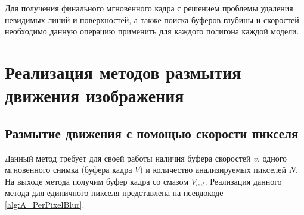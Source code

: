 Для получения финального мгновенного кадра с решением проблемы удаления невидимых линий и поверхностей, а также поиска буферов глубины и скоростей необходимо данную операцию применить для каждого полигона каждой модели.

\section{Реализация методов размытия движения изображения}





\subsection{Размытие движения с помощью скорости пикселя}

Данный метод требует для своей работы наличия буфера скоростей $v$, одного мгновенного снимка (буфера кадра $V$) и количество анализируемых пикселей $N$.  На выходе метода получим буфер кадра со смазом $V_{out}$. Реализация данного метода для единичного пикселя представлена на псевдокоде \ref{alg:A_PerPixelBlur}.

